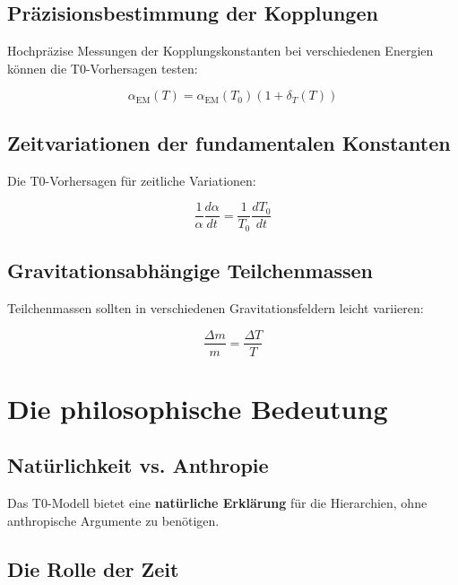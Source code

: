 \documentclass[12pt,a4paper]{report}
\begin{document}
	\subsection{Präzisionsbestimmung der Kopplungen}
	
	Hochpräzise Messungen der Kopplungskonstanten bei verschiedenen Energien können die T0-Vorhersagen testen:
	
	\begin{equation}
		\alpha_{\text{EM}}(T) = \alpha_{\text{EM}}(T_0)\left(1 + \delta_T(T)\right)
	\end{equation}
	
	\subsection{Zeitvariationen der fundamentalen Konstanten}
	
	Die T0-Vorhersagen für zeitliche Variationen:
	
	\begin{equation}
		\frac{1}{\alpha}\frac{d\alpha}{dt} = \frac{1}{T_0}\frac{dT_0}{dt}
	\end{equation}
	
	\subsection{Gravitationsabhängige Teilchenmassen}
	
	Teilchenmassen sollten in verschiedenen Gravitationsfeldern leicht variieren:
	
	\begin{equation}
		\frac{\Delta m}{m} = \frac{\Delta T}{T}
	\end{equation}
	
	\section{Die philosophische Bedeutung}
	
	\subsection{Natürlichkeit vs. Anthropie}
	
	Das T0-Modell bietet eine \textbf{natürliche Erklärung} für die Hierarchien, ohne anthropische Argumente zu benötigen.
	
	\subsection{Die Rolle der Zeit}
	
\end{document}
